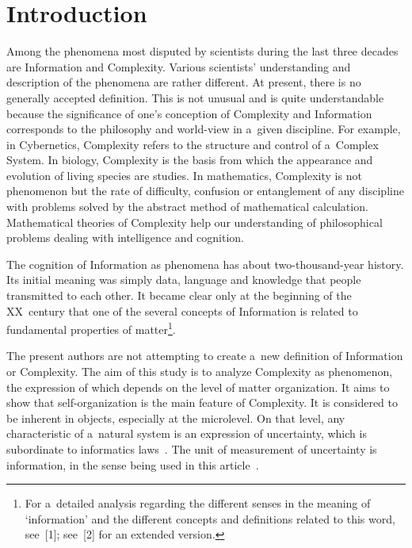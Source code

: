 

\vspace*{9pt}



      \thispagestyle{myheadings}

      \begin{multicols}{2}

                  \label{st\stat}

\section*{Introduction}
    
\noindent
Among the phenomena most disputed by scientists during the last three decades are Information  
and Complexity. Various scientists' understanding and description of the phenomena are rather 
different.  At present, there is no generally accepted definition. This is not unusual and is quite 
understandable because the significance of one's conception of Complexity and Information 
corresponds to the philosophy and world-view in a~given discipline. For example, in Cybernetics, 
Complexity refers to the structure and control of a~Complex System. In biology, Complexity is 
the basis from which the appearance and evolution of living species are studies. In mathematics, 
Complexity is not phenomenon but the rate of difficulty, confusion or entanglement of any 
discipline with problems solved by the abstract method of mathematical calculation. 
Mathematical theories of Complexity help our understanding of philosophical problems dealing 
with intelligence and cognition.

The cognition of Information as phenomena has about two-thousand-year history. Its initial 
meaning was simply data, language and knowledge that people transmitted to each other. It 
became clear only at the beginning of the XX~century that one of the several concepts of 
Information is related to fundamental properties of matter\footnote[3]{For a~detailed analysis regarding the different senses in the 
meaning of `information' and the different concepts and definitions related to this word, see~[1]; 
see~[2] for an extended version.}.

The present authors are not attempting to create a~new definition of Information or Complexity. The aim of this 
study is to analyze Complexity as phenomenon, the expression of which depends on the level of 
matter organization. It aims to show that self-organization is the main feature of Complexity. 
It is considered to be inherent in objects, especially at the microlevel. On that level, any characteristic of 
a~natural system is an expression of uncertainty, which is subordinate to informatics laws~\cite{3-sel}. 
The unit of measurement of uncertainty is information, in the sense being used in this article~\cite{4-sel, 5-sel}. 
{ %

}
\end{multicols}

